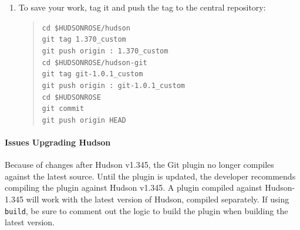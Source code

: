 \begin{enumerate}
\item{
To save your work, tag it and push the
tag to the central repository:
  \begin{quote} \texttt{cd \$HUDSONROSE/hudson \\
  git tag 1.370\_custom \\
  git push origin : 1.370\_custom \\
  cd \$HUDSONROSE/hudson-git \\
  git tag git-1.0.1\_custom \\
  git push origin : git-1.0.1\_custom \\
  cd \$HUDSONROSE \\
  git commit \\
  git push origin HEAD}
  \end{quote}
}
\end{enumerate}

\paragraph{Issues Upgrading Hudson}
Because of changes after Hudson v1.345, the Git plugin no longer
compiles against the latest source. Until the plugin is updated, the
developer recommends compiling the plugin against Hudson v1.345. A plugin 
compiled against Hudson-1.345 will work with the latest version of Hudson, compiled
separately. If using \texttt{build}, be sure to comment out the logic to 
build the plugin when building the latest version.
